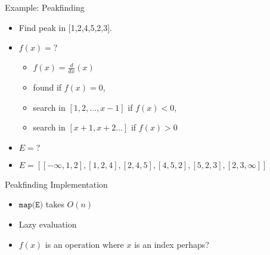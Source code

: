 \documentclass[presentation]{beamer}
\begin{document}
\begin{frame}[<+->][label={sec:org9a4d200}]{Example: Peakfinding}
\begin{itemize}
\item Find \alert{peak} in [1,2,4,5,2,3].
\item \(f(x) = ?\)
\begin{itemize}
\item \(f(x) = \frac{d}{dx}(x)\)
\item found if \(f(x) = 0\),
\item search in \([1,2,...,x - 1]\) if \(f(x) < 0\),
\item search in \([x + 1, x+2...]\) if \(f(x) > 0\)
\end{itemize}
\item \(E = ?\)
\item \(E = [[-\infty, 1, 2], [1,2,4], [2,4,5], [4,5,2],[5,2,3],[2,3,\infty]]\)
\end{itemize}
\end{frame}
\begin{frame}[<+->][label={sec:org0e8eb45}]{Peakfinding Implementation}
\begin{itemize}
\item \(\texttt{map(E)}\) takes \(O(n)\)
\item Lazy evaluation
\item \(f(x)\) is an operation where \(x\) is an index perhaps?
\end{itemize}
\end{frame}
\end{document}
